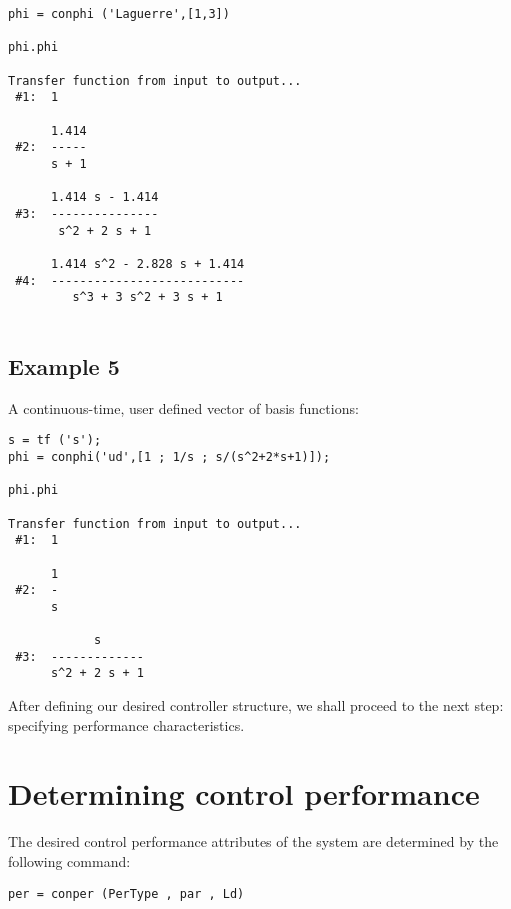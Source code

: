 \documentclass [12pt , a4paper] {report}
\begin{document}
\begin{lstlisting}
phi = conphi ('Laguerre',[1,3])

phi.phi
 
Transfer function from input to output...
 #1:  1
 
      1.414
 #2:  -----
      s + 1
 
      1.414 s - 1.414
 #3:  ---------------
       s^2 + 2 s + 1
 
      1.414 s^2 - 2.828 s + 1.414
 #4:  ---------------------------
         s^3 + 3 s^2 + 3 s + 1
         
\end{lstlisting}

\subsection{Example 5} A continuous-time, user defined vector of basis functions:

\begin{lstlisting}
s = tf ('s');
phi = conphi('ud',[1 ; 1/s ; s/(s^2+2*s+1)]);

phi.phi
 
Transfer function from input to output...
 #1:  1
 
      1
 #2:  -
      s
 
            s
 #3:  -------------
      s^2 + 2 s + 1
\end{lstlisting}

After defining our desired controller structure, we shall proceed to the next step: specifying performance characteristics.



\section{Determining control performance}
The desired control performance attributes of the system are determined by the following command:
\begin{lstlisting}
per = conper (PerType , par , Ld) 
\end{lstlisting}
\end{document}
